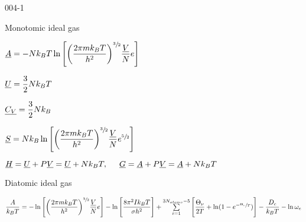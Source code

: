 \begin{mitframe}{004-1} %

    
\begin{listone}
        
    \item Monotomic ideal gas 
    
    \item $\uline{\helmholtz} = -\nummoles\boltz\Temp\ln\Bigg[\bigg(\dfrac{2\pie\mass\boltz\Temp}{\planck^{2}}\bigg)^{\sfrac{3}{2}}\dfrac{\uline{\vol}}{\nummoles}e\Bigg]$
    
    
    \item $\uline{\intenergy}=\dfrac{3}{2}\nummoles\boltz\Temp$
    
    \item $\uline{\cv}=\dfrac{3}{2}\nummoles\boltz$
    
    
    \item $\uline{\entropy}=\nummoles\boltz\ln\Bigg[\bigg(\dfrac{2\pie\mass\boltz\Temp}{\planck^{2}}\bigg)^{\sfrac{3}{2}}\dfrac{\uline{\vol}}{\nummoles}e^{\sfrac{5}{2}}\Bigg]$
    
    
    \item $\uline{\enthalpy}=\uline{\intenergy}+\p\uline{\vol}=\uline{\intenergy}+\nummoles\boltz\Temp,\tab \uline{\gibbs}=\uline{\helmholtz}+\p\uline{\vol}=\uline{\helmholtz}+\nummoles\boltz\Temp$
    
    
    \item Diatomic ideal gas 
   
   	\item $\dfrac{\helmholtz}{\boltz\Temp}=-\ln\Bigg[\bigg(\dfrac{2\pie\mass\boltz\Temp}{\planck^{2}}\bigg)^{\sfrac{3}{2}}\dfrac{\uline{\vol}}{\nummoles}e\Bigg]-\ln\Bigg[\dfrac{8\pie^{2}\mominertia\boltz\Temp}{\molecrad\planck^{2}}\Bigg]+\sum\limits_{i=1}^{3\nummoles_{atoms}-5}\Bigg[\dfrac{\vibrfreqfac}{2\Temp}+\ln(1-e^{-\sfrac{\vibrfreqfac}{\Temp}})\Bigg]-\dfrac{\eneatom}{\boltz\Temp}-\ln\elecdegen$
    

\end{listone}
\end{mitframe}
